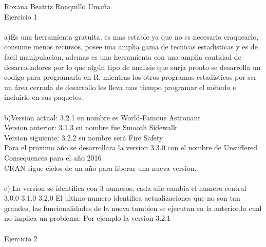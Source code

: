 \documentclass{article}\usepackage[]{graphicx}\usepackage[]{color}
\begin{document}
Roxana Beatriz Ronquillo Umaña\\
Ejercicio 1\\
\\
a)Es una herramienta gratuita, es mas estable ya que no es necesario craquearlo,\\ consume menos recursos, posee una amplia gama de tecnicas estadisticas y es de facil manipulacion, ademas es una herramienta con una amplia cantidad de desarrolladores por lo que algún tipo de analisis que surja pronto se desarrolla un codigo para programarlo en R, mientras los otros programas estadisticos por ser un área cerrada de desarrollo les lleva mas tiempo programar el método e incluirlo en sus paquetes.\\
\\
b)Version actual: 3.2.1 su nombre es World-Famous Astronaut\\
  Version anterior: 3.1.3 su nombre fue Smooth Sidewalk\\
  Version siguiente: 3.2.2  su nombre será Fire Safety\\
  Para el proximo año se desarrollara la version 3.3.0 con el nombre de Unsuffered Consequences para el año 2016\\ CRAN sigue ciclos de un año para liberar una nueva version.\\
  \\
c) La version se identifica con 3 numeros, cada año cambia el numero central 3.0.0
        3.1.0
        3.2.0
El ultimo numero identifica actualizaciones que no son tan grandes, las funcionalidades de la nueva tambien se ejecutan en la anterior,lo cual no implica un problema. Por ejemplo la version 3.2.1\\
\\
Ejercicio 2\\
\\
\end{document}
